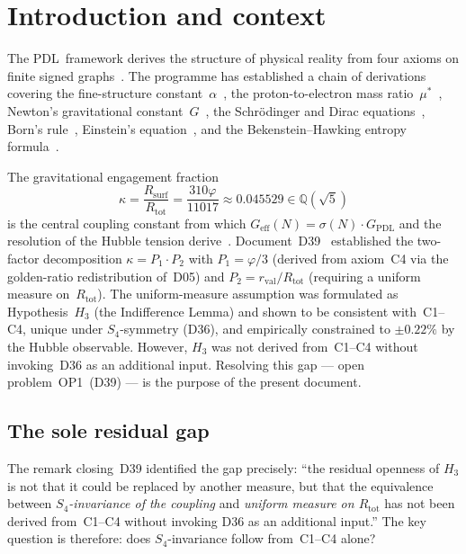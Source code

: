 \documentclass[11pt,a4paper]{article}
\theoremstyle{plain}
\theoremstyle{definition}
\theoremstyle{remark}
\newcommand{\PDL}{\textnormal{PDL}}
\newcommand{\Rtot}{R_{\mathrm{tot}}}
\newcommand{\Rsurf}{R_{\mathrm{surf}}}
\newcommand{\rval}{r_{\mathrm{val}}}
\newcommand{\vp}{\varphi}
\newcommand{\kap}{\kappa}
\newcommand{\GPDL}{G_{\mathrm{PDL}}}
\newcommand{\sigmaN}{\sigma(N)}
\begin{document}
\newpage

\tableofcontents

\newpage 

\section{Introduction and context}
\label{sec:intro}

The \PDL\ framework derives the structure of physical reality from four axioms on finite signed graphs~\cite{PDL_D01_2026,PDL_Main_2026}. The programme has established a chain of derivations covering the fine-structure constant~$\alpha$~\cite{PDL_D12_2026}, the proton-to-electron mass ratio~$\mu^*$~\cite{PDL_D30_2026}, Newton's gravitational constant~$G$~\cite{PDL_D21_2026}, the Schr\"odinger and Dirac equations~\cite{PDL_D32_2026,PDL_D33_2026}, Born's rule~\cite{PDL_D34_2026}, Einstein's equation~\cite{PDL_D35_2026}, and the Bekenstein--Hawking entropy formula~\cite{PDL_D37_2026,PDL_D38_2026}.

The gravitational engagement fraction
\begin{equation}
\kap = \frac{\Rsurf}{\Rtot} = \frac{310\vp}{11017} \approx 0.045529 \in \mathbb{Q}(\sqrt{5})
\label{eq:kappa}
\end{equation}
is the central coupling constant from which $G_{\mathrm{eff}}(N) = \sigmaN \cdot \GPDL$ and the resolution of the Hubble tension derive~\cite{PDL_D24_2026,PDL_D36_2026}. Document~D39~\cite{PDL_D39_2026} established the two-factor decomposition $\kap = P_1 \cdot P_2$ with $P_1 = \vp/3$ (derived from axiom~C4 via the golden-ratio redistribution of~D05) and $P_2 = \rval/\Rtot$ (requiring a uniform measure on~$\Rtot$). The uniform-measure assumption was formulated as Hypothesis~$H_3$ (the Indifference Lemma) and shown to be consistent with~C1--C4, unique under $S_4$-symmetry (D36), and empirically constrained to $\pm 0.22\%$ by the Hubble observable. However, $H_3$ was not derived from~C1--C4 without invoking~D36 as an additional input. Resolving this gap --- open problem~OP1~(D39) --- is the purpose of the present document.

\subsection{The sole residual gap}

The remark closing~D39 identified the gap precisely: ``the residual openness of $H_3$ is not that it could be replaced by another measure, but that the equivalence between \emph{$S_4$-invariance of the coupling} and \emph{uniform measure on $\Rtot$} has not been derived from~C1--C4 without invoking D36 as an additional input.'' The key question is therefore: does $S_4$-invariance follow from~C1--C4 alone?
\end{document}
